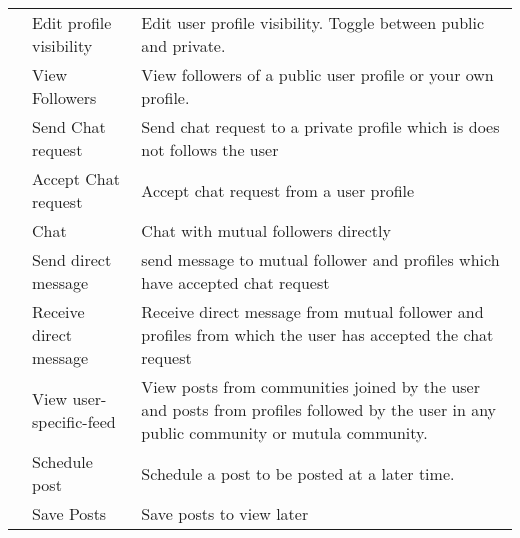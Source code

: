 \documentclass[conference,compsoc]{IEEEtran}
\begin{document}
\begin{table}[H]
\begin{tabular}{|M{2cm}|p{2.3cm}|p{3.2cm}|}
                                           & Edit profile visibility       & Edit user profile visibility. Toggle between public and private.                                                                         \\
                                           & View Followers                & View followers of a public user profile or your own profile.                                                                             \\

                                           & Send Chat request             & Send chat request to a private profile which is does not follows the user                                                                \\
                                           & Accept Chat request           & Accept chat request from a user profile                                                                                                  \\
                                           & Chat                          & Chat with mutual followers directly                                                                                                      \\
                                           & Send direct message           & send message to mutual follower and profiles which have accepted chat request                                                            \\
                                           & Receive direct message        & Receive direct message from mutual follower and profiles from which the user has accepted the chat request                               \\
                                           & View user-specific-feed       & View posts from communities joined by the user and posts from profiles followed by the user in any public community or mutula community. \\
                                           & Schedule post                 & Schedule a post to be posted at a later time.                                                                                            \\
                                           & Save Posts                    & Save posts to view later                                                                                                                 \\

\end{tabular}
\end{table}
\end{document}
